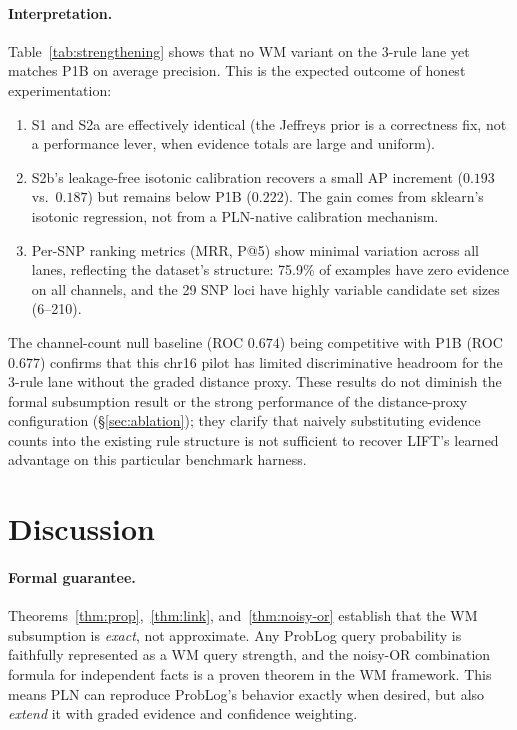 \documentclass[]{article}
\begin{document}
\paragraph{Interpretation.}
Table~\ref{tab:strengthening} shows that no WM variant on the 3-rule
lane yet matches P1B on average precision.  This is the expected
outcome of honest experimentation:
\begin{enumerate}
\item S1 and S2a are effectively identical (the Jeffreys prior is a
  correctness fix, not a performance lever, when evidence totals are
  large and uniform).
\item S2b's leakage-free isotonic calibration recovers a small AP
  increment ($0.193$ vs.\ $0.187$) but remains below P1B ($0.222$).
  The gain comes from sklearn's isotonic regression, not from a
  PLN-native calibration mechanism.
\item Per-SNP ranking metrics (MRR, P@5) show minimal variation
  across all lanes, reflecting the dataset's structure: 75.9\% of
  examples have zero evidence on all channels, and the 29 SNP loci
  have highly variable candidate set sizes (6--210).
\end{enumerate}
The channel-count null baseline (ROC $0.674$) being competitive with
P1B (ROC $0.677$) confirms that this chr16 pilot has limited
discriminative headroom for the 3-rule lane without the graded
distance proxy.  These results do not diminish the formal subsumption
result or the strong performance of the distance-proxy configuration
(\S\ref{sec:ablation}); they clarify that naively substituting
evidence counts into the existing rule structure is not sufficient to
recover LIFT's learned advantage on this particular benchmark harness.

\section{Discussion}
\label{sec:discussion}

\paragraph{Formal guarantee.}
Theorems~\ref{thm:prop},~\ref{thm:link}, and~\ref{thm:noisy-or} establish that
the WM subsumption is \emph{exact}, not approximate.  Any ProbLog query probability
is faithfully represented as a WM query strength, and the noisy-OR combination
formula for independent facts is a proven theorem in the WM framework.  This means
PLN can reproduce ProbLog's behavior exactly when desired, but also \emph{extend}
it with graded evidence and confidence weighting.
\end{document}
